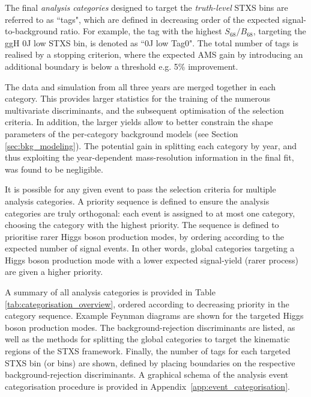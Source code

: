 \begin{enumerate}
    The final \textit{analysis categories} designed to target the \textit{truth-level} STXS bins are referred to as ``tags", which are defined in decreasing order of the expected signal-to-background ratio. For example, the tag with the highest $S_{68}/B_{68}$, targeting the ggH 0J low \ptH STXS bin, is denoted as ``0J low \ptgg Tag0". The total number of tags is realised by a stopping criterion, where the expected AMS gain by introducing an additional boundary is below a threshold e.g. 5\% improvement.
\end{enumerate}

The data and simulation from all three years are merged together in each category. This provides larger statistics for the training of the numerous multivariate discriminants, and the subsequent optimisation of the selection criteria. In addition, the larger yields allow to better constrain the shape parameters of the per-category background models (see Section \ref{sec:bkg_modeling}). The potential gain in splitting each category by year, and thus exploiting the year-dependent mass-resolution information in the final fit, was found to be negligible. 

It is possible for any given event to pass the selection criteria for multiple analysis categories. A priority sequence is defined to ensure the analysis categories are truly orthogonal: each event is assigned to at most one category, choosing the category with the highest priority. The sequence is defined to prioritise rarer Higgs boson production modes, by ordering according to the expected number of signal events. In other words, global categories targeting a Higgs boson production mode with a lower expected signal-yield (rarer process) are given a higher priority.

A summary of all analysis categories is provided in Table \ref{tab:categorisation_overview}, ordered according to decreasing priority in the category sequence. Example Feynman diagrams are shown for the targeted Higgs boson production modes. The background-rejection discriminants are listed, as well as the methods for splitting the global categories to target the kinematic regions of the STXS framework. Finally, the number of tags for each targeted STXS bin (or bins) are shown, defined by placing boundaries on the respective background-rejection discriminants. A graphical schema of the analysis event categorisation procedure is provided in Appendix~\ref{app:event_categorisation}.

